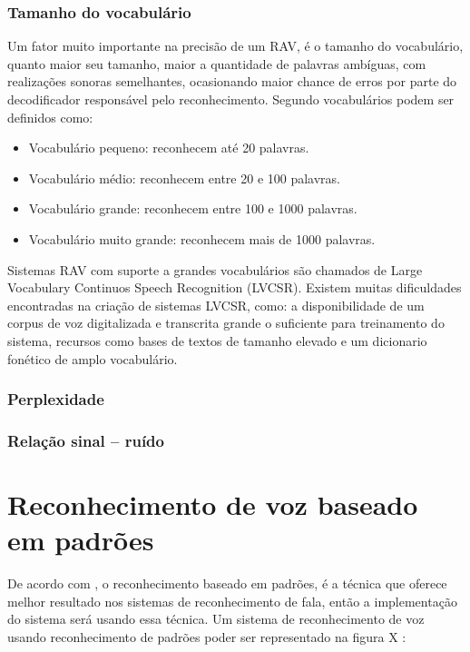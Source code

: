 \subsubsection{Tamanho do vocabulário}
Um fator muito importante na precisão de um RAV, é o tamanho do vocabulário, quanto maior seu tamanho, maior a quantidade de palavras ambíguas, com realizações sonoras semelhantes, ocasionando maior chance de erros por parte do decodificador responsável pelo reconhecimento.\cite{RavPtBr} Segundo \cite{RavIsoladas} vocabulários podem ser definidos como:

\begin{itemize}
\item Vocabulário pequeno: reconhecem até 20 palavras. 
\item Vocabulário médio: reconhecem entre 20 e 100 palavras. 
\item Vocabulário grande: reconhecem entre 100 e 1000 palavras. 
\item Vocabulário muito grande: reconhecem mais de 1000 palavras. 
\end{itemize}

Sistemas RAV com suporte a grandes vocabulários são chamados de Large Vocabulary Continuos Speech Recognition (LVCSR). Existem muitas dificuldades encontradas na criação de sistemas LVCSR, como: a disponibilidade de um corpus de voz digitalizada e transcrita grande o suficiente para treinamento do sistema, recursos como bases de textos de
tamanho elevado e um dicionario fonético de amplo vocabulário.\cite{RvPatrick}
\subsubsection{Perplexidade} 

\subsubsection{Relação sinal – ruído}

\section{Reconhecimento de voz baseado em padrões}\label{sec:red_neu}
De acordo com \cite{AvaliaTecJose}, o reconhecimento baseado em padrões, é a técnica que oferece melhor resultado nos sistemas de reconhecimento de fala, então a implementação do sistema será usando essa técnica.
Um sistema de reconhecimento de voz usando reconhecimento de padrões poder ser representado na figura X \cite{FundamentRabiner}:
 
